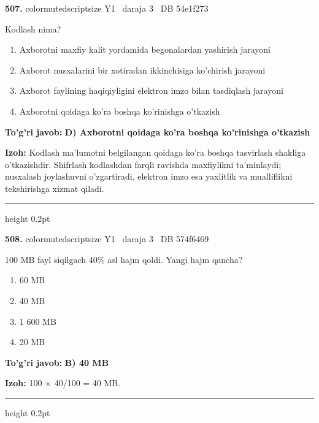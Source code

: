 \documentclass[10pt,a4paper,oneside]{article}
\begin{document}
\noindent\textbf{\color{ink}507.}  {color{muted}scriptsize Y1 \textbullet\ daraja 3 \textbullet\ DB 54e1f273}
\par
Kodlash nima?
\begin{enumerate}[label=\Alph*),leftmargin=9mm]
\item Axborotni maxfiy kalit yordamida begonalardan yashirish jarayoni
\item Axborot nusxalarini bir xotiradan ikkinchisiga ko'chirish jarayoni
\item Axborot faylining haqiqiyligini elektron imzo bilan tasdiqlash jarayoni
\item Axborotni qoidaga ko'ra boshqa ko'rinishga o'tkazish
\end{enumerate}
\begin{tcolorbox}[enhanced,breakable,colback=teal!4,colframe=teal!50!black,boxrule=0.5pt,arc=1.1mm,left=3mm,right=3mm,top=1.7mm,bottom=1.7mm,before skip=2mm,after skip=2mm]
\textbf{\color{teal}To'g'ri javob:} \textbf{D) Axborotni qoidaga ko'ra boshqa ko'rinishga o'tkazish}
\par\smallskip
\textbf{Izoh:} Kodlash ma'lumotni belgilangan qoidaga ko'ra boshqa tasvirlash shakliga o'tkazishdir. Shifrlash kodlashdan farqli ravishda maxfiylikni ta'minlaydi; nusxalash joylashuvni o'zgartiradi, elektron imzo esa yaxlitlik va mualliflikni tekshirishga xizmat qiladi.
\end{tcolorbox}
\vspace{2mm}\hrule height 0.2pt \vspace{3mm}

\noindent\textbf{\color{ink}508.}  {color{muted}scriptsize Y1 \textbullet\ daraja 3 \textbullet\ DB 574f6469}
\par
100 MB fayl siqilgach 40\% asl hajm qoldi. Yangi hajm qancha?
\begin{enumerate}[label=\Alph*),leftmargin=9mm]
\item 60 MB
\item 40 MB
\item 1 600 MB
\item 20 MB
\end{enumerate}
\begin{tcolorbox}[enhanced,breakable,colback=teal!4,colframe=teal!50!black,boxrule=0.5pt,arc=1.1mm,left=3mm,right=3mm,top=1.7mm,bottom=1.7mm,before skip=2mm,after skip=2mm]
\textbf{\color{teal}To'g'ri javob:} \textbf{B) 40 MB}
\par\smallskip
\textbf{Izoh:} 100 \ensuremath{\times} 40/100 = 40 MB.
\end{tcolorbox}
\vspace{2mm}\hrule height 0.2pt \vspace{3mm}
\end{document}
